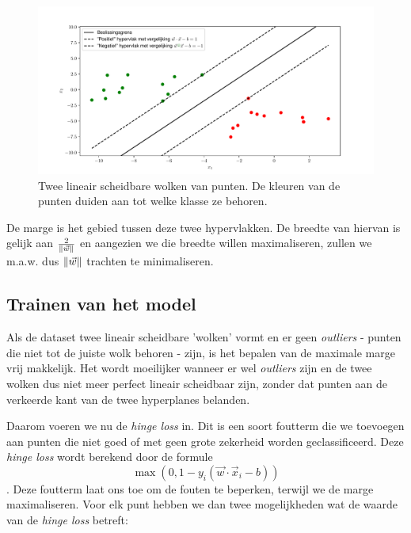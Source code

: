 \documentclass[TeamE-eindrapport]{subfiles}
\begin{document}
	\begin{figure}[h!]
		\centering
		\includegraphics[width=.7\textwidth]{svm-afbeelding}
		\caption{Twee lineair scheidbare wolken van punten. De kleuren van de punten duiden aan tot welke klasse ze behoren.}
		\label{fig:svm}
	\end{figure}
	
	De marge is het gebied tussen deze twee hypervlakken. De breedte van hiervan is gelijk aan \(\frac{2}{\left\| \vec{w} \right\|}\) en aangezien we die breedte willen maximaliseren, zullen we m.a.w. dus \(\left\| \vec{w} \right\|\) trachten te minimaliseren.
	
	\subsection{Trainen van het model}
	
	Als de dataset twee lineair scheidbare 'wolken' vormt en er geen \textit{outliers} - punten die niet tot de juiste wolk behoren - zijn, is het bepalen van de maximale marge vrij makkelijk. Het wordt moeilijker wanneer er wel \textit{outliers} zijn en de twee wolken dus niet meer perfect lineair scheidbaar zijn, zonder dat punten aan de verkeerde kant van de twee hyperplanes belanden.
	
	Daarom voeren we nu de \textit{hinge loss} in. Dit is een soort foutterm die we toevoegen aan punten die niet goed of met geen grote zekerheid worden geclassificeerd. Deze \textit{hinge loss} wordt berekend door de formule \[\max{(0,1-y_i(\vec{w}\cdot\vec{x}_i-b))}\]. Deze foutterm laat ons toe om de fouten te beperken, terwijl we de marge maximaliseren. Voor elk punt hebben we dan twee mogelijkheden wat de waarde van de \textit{hinge loss} betreft:
	
\end{document}
